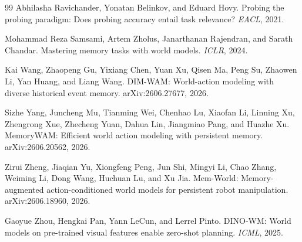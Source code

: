 \begin{thebibliography}{99}
Abhilasha Ravichander, Yonatan Belinkov, and Eduard Hovy.
\newblock Probing the probing paradigm: Does probing accuracy entail task relevance?
\newblock \emph{EACL}, 2021.

Mohammad Reza Samsami, Artem Zholus, Janarthanan Rajendran, and Sarath Chandar.
\newblock Mastering memory tasks with world models.
\newblock \emph{ICLR}, 2024.

Kai Wang, Zhaopeng Gu, Yixiang Chen, Yuan Xu, Qisen Ma, Peng Su, Zhaowen Li, Yan Huang, and Liang Wang.
\newblock DIM-WAM: World-action modeling with diverse historical event memory.
\newblock arXiv:2606.27677, 2026.

Sizhe Yang, Juncheng Mu, Tianming Wei, Chenhao Lu, Xiaofan Li, Linning Xu, Zhengrong Xue, Zhecheng Yuan, Dahua Lin, Jiangmiao Pang, and Huazhe Xu.
\newblock MemoryWAM: Efficient world action modeling with persistent memory.
\newblock arXiv:2606.20562, 2026.

Zirui Zheng, Jiaqian Yu, Xiongfeng Peng, Jun Shi, Mingyi Li, Chao Zhang, Weiming Li, Dong Wang, Huchuan Lu, and Xu Jia.
\newblock Mem-World: Memory-augmented action-conditioned world models for persistent robot manipulation.
\newblock arXiv:2606.18960, 2026.

Gaoyue Zhou, Hengkai Pan, Yann LeCun, and Lerrel Pinto.
\newblock DINO-WM: World models on pre-trained visual features enable zero-shot planning.
\newblock \emph{ICML}, 2025.

\end{thebibliography}
